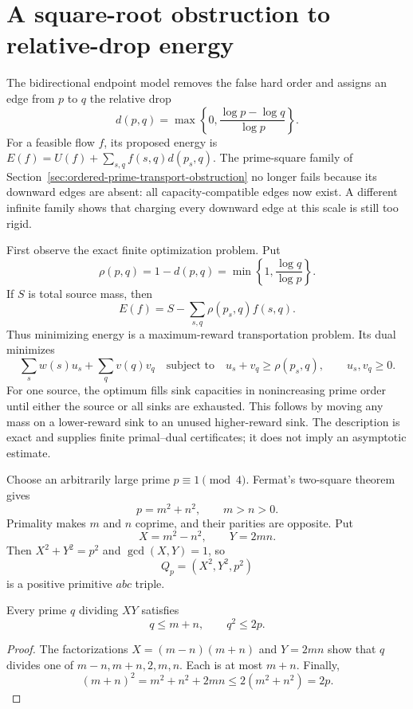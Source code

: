 \section{A square-root obstruction to relative-drop energy}
\label{sec:bidirectional-energy-obstruction}

The bidirectional endpoint model removes the false hard order and assigns an
edge from $p$ to $q$ the relative drop
\[
 d(p,q)=\max\left\{0,\frac{\log p-\log q}{\log p}\right\}.
\]
For a feasible flow $f$, its proposed energy is
$E(f)=U(f)+\sum_{s,q}f(s,q)d(p_s,q)$.  The prime-square family of
Section~\ref{sec:ordered-prime-transport-obstruction} no longer fails because
its downward edges are absent: all capacity-compatible edges now exist.  A
different infinite family shows that charging every downward edge at this
scale is still too rigid.

First observe the exact finite optimization problem.  Put
\[
 \rho(p,q)=1-d(p,q)
 =\min\left\{1,\frac{\log q}{\log p}\right\}.
\]
If $S$ is total source mass, then
\[
 E(f)=S-\sum_{s,q}\rho(p_s,q)f(s,q).
\tag{BRE-1}
\]
Thus minimizing energy is a maximum-reward transportation problem.  Its dual
minimizes
\[
 \sum_s w(s)u_s+\sum_qv(q)v_q
 \quad\text{subject to}\quad
 u_s+v_q\ge\rho(p_s,q),\qquad u_s,v_q\ge0.
\]
For one source, the optimum fills sink capacities in nonincreasing prime
order until either the source or all sinks are exhausted.  This follows by
moving any mass on a lower-reward sink to an unused higher-reward sink.  The
description is exact and supplies finite primal--dual certificates; it does
not imply an asymptotic estimate.

Choose an arbitrarily large prime $p\equiv1\pmod4$.  Fermat's two-square
theorem gives
\[
 p=m^2+n^2,\qquad m>n>0.
\]
Primality makes $m$ and $n$ coprime, and their parities are opposite.  Put
\[
 X=m^2-n^2,\qquad Y=2mn.
\]
Then $X^2+Y^2=p^2$ and $\gcd(X,Y)=1$, so
\[
 Q_p=(X^2,Y^2,p^2)
\tag{BRE-2}
\]
is a positive primitive $abc$ triple.

\begin{lemma}
\label{lem:pythagorean-square-root-support}
Every prime $q$ dividing $XY$ satisfies
\[
 q\le m+n,\qquad q^2\le2p.
\]
\end{lemma}

\begin{proof}
The factorizations
$X=(m-n)(m+n)$ and $Y=2mn$ show that $q$ divides one of
$m-n,m+n,2,m,n$.  Each is at most $m+n$.  Finally,
\[
 (m+n)^2=m^2+n^2+2mn\le2(m^2+n^2)=2p.
\]
\end{proof}

